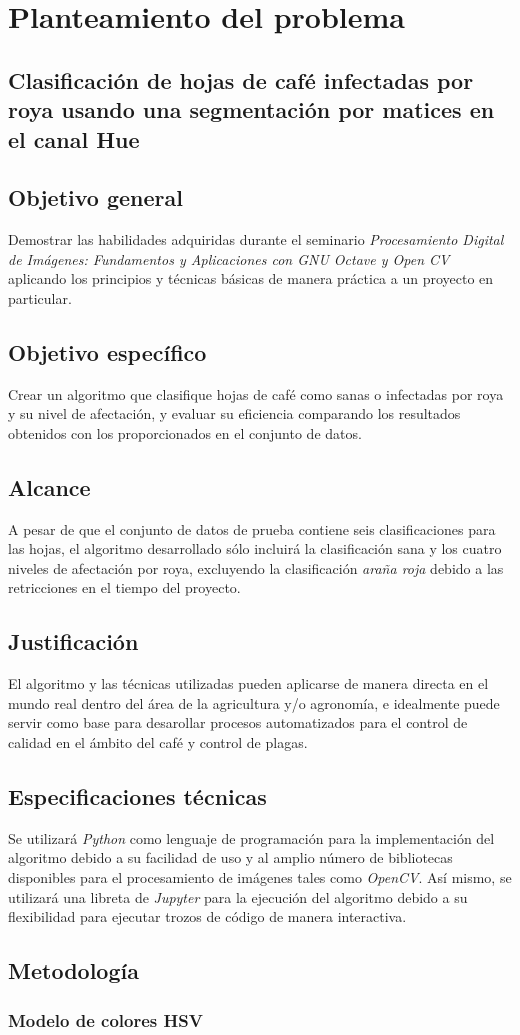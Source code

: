 \chapter{Planteamiento del problema}

\section{Clasificación de hojas de café infectadas por roya usando una segmentación por matices en el canal Hue}

\section{Objetivo general}
Demostrar las habilidades adquiridas durante el seminario \textit{Procesamiento Digital de Imágenes: Fundamentos y Aplicaciones con GNU Octave y Open CV} aplicando los principios y técnicas básicas de manera práctica a un proyecto en particular.

\section{Objetivo específico}
Crear un algoritmo que clasifique hojas de café como sanas o infectadas por roya y su nivel de afectación, y evaluar su eficiencia comparando los resultados obtenidos con los proporcionados en el conjunto de datos.

\section{Alcance}
A pesar de que el conjunto de datos de prueba contiene seis clasificaciones para las hojas, el algoritmo desarrollado sólo incluirá la clasificación sana y los cuatro niveles de afectación por roya, excluyendo la clasificación \textit{araña roja} debido a las retricciones en el tiempo del proyecto.

\section{Justificación}
El algoritmo y las técnicas utilizadas pueden aplicarse de manera directa en el mundo real dentro del área de la agricultura y/o agronomía, e idealmente puede servir como base para desarollar procesos automatizados para el control de calidad en el ámbito del café y control de plagas.
 
\section{Especificaciones técnicas}
Se utilizará \textit{Python} como lenguaje de programación para la implementación del algoritmo debido a su facilidad de uso y al amplio número de bibliotecas disponibles para el procesamiento de imágenes tales como \textit{OpenCV}. Así mismo, se utilizará una libreta de \textit{Jupyter} para la ejecución del algoritmo debido a su flexibilidad para ejecutar trozos de código de manera interactiva.

\section{Metodología}

\subsection{Modelo de colores HSV}